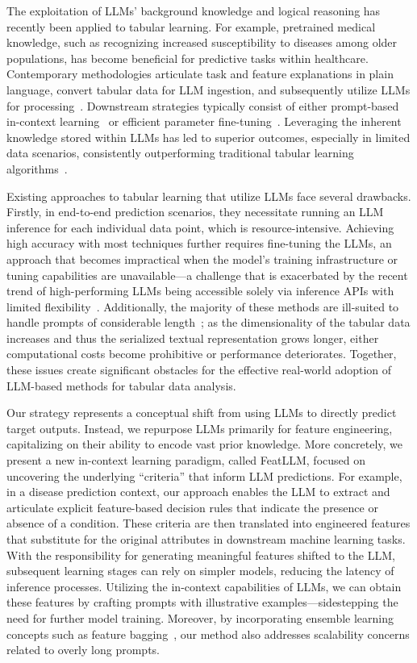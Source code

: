 The exploitation of LLMs’ background knowledge and logical reasoning has recently been applied to tabular learning. For example, pretrained medical knowledge, such as recognizing increased susceptibility to diseases among older populations, has become beneficial for predictive tasks within healthcare. Contemporary methodologies articulate task and feature explanations in plain language, convert tabular data for LLM ingestion, and subsequently utilize LLMs for processing~\cite{dinh2022lift,wang2023anypredict}. Downstream strategies typically consist of either prompt-based in-context learning~\cite{nam2023semi} or efficient parameter fine-tuning~\cite{dinh2022lift,hegselmann2023tabllm}. Leveraging the inherent knowledge stored within LLMs has led to superior outcomes, especially in limited data scenarios, consistently outperforming traditional tabular learning algorithms~\cite{hegselmann2023tabllm}.

Existing approaches to tabular learning that utilize LLMs face several drawbacks. Firstly, in end-to-end prediction scenarios, they necessitate running an LLM inference for each individual data point, which is resource-intensive. Achieving high accuracy with most techniques further requires fine-tuning the LLMs, an approach that becomes impractical when the model’s training infrastructure or tuning capabilities are unavailable—a challenge that is exacerbated by the recent trend of high-performing LLMs being accessible solely via inference APIs with limited flexibility~\cite{anil2023palm,openai2023gpt4}. Additionally, the majority of these methods are ill-suited to handle prompts of considerable length~\cite{liu2023lost}; as the dimensionality of the tabular data increases and thus the serialized textual representation grows longer, either computational costs become prohibitive or performance deteriorates. Together, these issues create significant obstacles for the effective real-world adoption of LLM-based methods for tabular data analysis.

Our strategy represents a conceptual shift from using LLMs to directly predict target outputs. Instead, we repurpose LLMs primarily for feature engineering, capitalizing on their ability to encode vast prior knowledge. More concretely, we present a new in-context learning paradigm, called \textsf{FeatLLM}, focused on uncovering the underlying “criteria” that inform LLM predictions. For example, in a disease prediction context, our approach enables the LLM to extract and articulate explicit feature-based decision rules that indicate the presence or absence of a condition. These criteria are then translated into engineered features that substitute for the original attributes in downstream machine learning tasks. With the responsibility for generating meaningful features shifted to the LLM, subsequent learning stages can rely on simpler models, reducing the latency of inference processes. Utilizing the in-context capabilities of LLMs, we can obtain these features by crafting prompts with illustrative examples—sidestepping the need for further model training. Moreover, by incorporating ensemble learning concepts such as feature bagging~\cite{breiman2001random}, our method also addresses scalability concerns related to overly long prompts.

